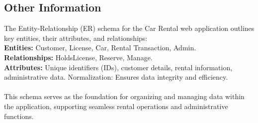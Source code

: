 \subsection{Other Information}


The Entity-Relationship (ER) schema for the Car Rental web application outlines key entities, their attributes, and relationships:\\

\textbf{Entities:} Customer, License, Car, Rental Transaction, Admin.\\
\textbf{Relationships:} HoldsLicense, Reserve, Manage.\\
\textbf{Attributes:} Unique identifiers (IDs), customer details, rental information, administrative data.
Normalization: Ensures data integrity and efficiency.\\\\

This schema serves as the foundation for organizing and managing data within the application, supporting seamless rental operations and administrative functions.